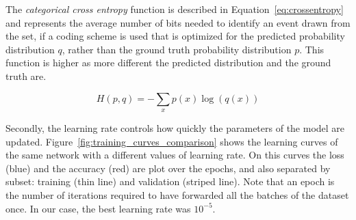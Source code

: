 The \textit{categorical cross entropy} function is described in Equation~\ref{eq:crossentropy} and represents the average number of bits needed to identify an event drawn from the set, if a coding scheme is used that is optimized for the predicted probability distribution $q$, rather than the ground truth probability distribution $p$. This function is higher as more different the predicted distribution and the ground truth are.%

\begin{equation}
\label{eq:crossentropy}
	H(p,q) = - \sum_x p(x) \log(q(x))
\end{equation}


Secondly, the learning rate controls how quickly the parameters of the model are updated. 
Figure~\ref{fig:training_curves_comparison} shows the learning curves of the same network with a different values of learning rate. On this curves the loss (blue) and the accuracy (red) are plot over the epochs, and also separated by subset: training (thin line) and validation (striped line). Note that an epoch is the number of iterations required to have forwarded all the batches of the dataset once. In our case, the best learning rate was $10^{-5}$. %




